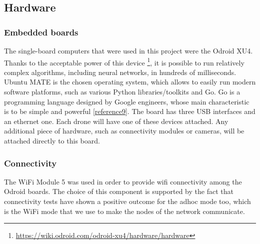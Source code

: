 \documentclass[10pt,conference,compsocconf]{IEEEtran}
\begin{document}
\subsection{Hardware}
\subsubsection{Embedded boards}
The single-board computers that were used in this project were the Odroid XU4. Thanks to the acceptable power of this device \footnote{\url{https://wiki.odroid.com/odroid-xu4/hardware/hardware}}, it is possible to run relatively complex algorithms, including neural networks, in hundreds of milliseconds. Ubuntu MATE is the chosen operating system, which allows to easily run modern software platforms, such as various Python libraries/toolkits and Go. Go is a programming language designed by Google engineers, whose main characteristic is to be simple and powerful \ref{reference9}. The board has three USB interfaces and an ethernet one. Each drone will have one of these devices attached. Any additional piece of hardware, such as connectivity modules or cameras, will be attached directly to this board.
\subsubsection{Connectivity}
The WiFi Module 5 was used in order to provide wifi connectivity among the Odroid boards. The choice of this component is supported by the fact that connectivity tests have shown a positive outcome for the adhoc mode too, which is the WiFi mode that we use to make the nodes of the network communicate.
\end{document}
